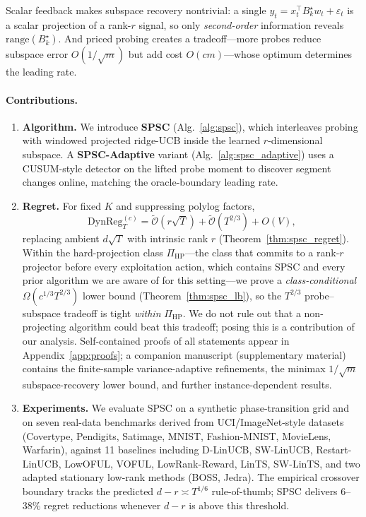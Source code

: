 \documentclass{article}
\newcommand{\tilO}{\widetilde{\mathcal{O}}}
\newcommand{\DynReg}{\mathrm{DynReg}}
\newcommand{\range}{\mathrm{range}}
\begin{document}
Scalar feedback makes subspace recovery nontrivial: a single
$y_t = x_t^\top B_k^\star w_t + \varepsilon_t$ is a scalar projection
of a rank-$r$ signal, so only \emph{second-order} information reveals
$\range(B_k^\star)$. And priced probing creates a
tradeoff---more probes reduce subspace error $O(1/\sqrt{m})$ but
add cost $O(cm)$---whose optimum determines the leading
rate.

\paragraph{Contributions.}
\begin{enumerate}[leftmargin=1.5em,itemsep=2pt]
\item \textbf{Algorithm.} We introduce \textbf{SPSC}
(Alg.~\ref{alg:spsc}), which interleaves probing
with windowed projected ridge-UCB inside the learned
$r$-dimensional subspace. A \textbf{SPSC-Adaptive}
variant (Alg.~\ref{alg:spsc_adaptive})
uses a CUSUM-style detector on the lifted probe moment to
discover segment changes online, matching the oracle-boundary
leading rate.
\item \textbf{Regret.} For fixed $K$ and suppressing polylog factors,
\[
\DynReg_T^{(c)} = \tilO(r\sqrt{T}) + \tilO(T^{2/3}) + O(V),
\]
replacing ambient $d\sqrt{T}$ with intrinsic rank $r$
(Theorem~\ref{thm:spsc_regret}). Within the hard-projection class
$\Pi_{\mathrm{HP}}$---the class that commits to a rank-$r$ projector
before every exploitation action, which contains SPSC and every prior
algorithm we are aware of for this setting---we prove a
\emph{class-conditional}
$\Omega(c^{1/3}T^{2/3})$ lower bound (Theorem~\ref{thm:spsc_lb}), so
the $T^{2/3}$ probe--subspace tradeoff is tight \emph{within} $\Pi_{\mathrm{HP}}$.
We do not rule out that a non-projecting algorithm could beat this
tradeoff; posing this is a contribution of our analysis. Self-contained
proofs of all statements appear in Appendix~\ref{app:proofs}; a
companion manuscript (supplementary material) contains the
finite-sample variance-adaptive refinements, the minimax
$1/\sqrt m$ subspace-recovery lower bound, and further instance-dependent
results.
\item \textbf{Experiments.} We evaluate SPSC on a synthetic phase-transition
grid and on seven real-data benchmarks derived from UCI/ImageNet-style datasets
(Covertype, Pendigits, Satimage, MNIST, Fashion-MNIST, MovieLens, Warfarin),
against 11 baselines including D-LinUCB, SW-LinUCB, Restart-LinUCB, LowOFUL,
VOFUL, LowRank-Reward, LinTS, SW-LinTS, and two adapted stationary low-rank
methods (BOSS, Jedra). The empirical crossover boundary tracks
the predicted $d-r \asymp T^{1/6}$ rule-of-thumb; SPSC delivers 6--38\%
regret reductions whenever $d - r$ is above this threshold.
\end{enumerate}
\end{document}
